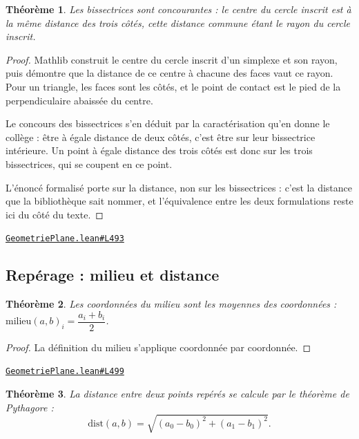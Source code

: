 \documentclass[11pt,a4paper]{article}
\theoremstyle{definition}
\theoremstyle{plain}
\newtheorem{theoreme}{Théorème}
\newcommand{\source}[2]{\par\smallskip\noindent\hfill{\footnotesize\href{#1}{\texttt{#2}}}\par\smallskip}
\begin{document}
\begin{theoreme}
Les bissectrices sont concourantes : le centre du cercle inscrit est à la même distance
des trois côtés, cette distance commune étant le rayon du cercle inscrit.
\end{theoreme}

\begin{proof}
Mathlib construit le centre du cercle inscrit d'un simplexe et son rayon, puis démontre que
la distance de ce centre à chacune des faces vaut ce rayon. Pour un triangle, les faces sont
les côtés, et le point de contact est le pied de la perpendiculaire abaissée du centre.

Le concours des bissectrices s'en déduit par la caractérisation qu'en donne le collège :
être à égale distance de deux côtés, c'est être sur leur bissectrice intérieure. Un point à
égale distance des trois côtés est donc sur les trois bissectrices, qui se coupent en ce
point.

L'énoncé formalisé porte sur la distance, non sur les bissectrices : c'est la distance que
la bibliothèque sait nommer, et l'équivalence entre les deux formulations reste ici du côté
du texte.
\end{proof}
\source{https://github.com/Commutator-IO/learn-lean/blob/main/courses/01-college/02-geometrie-plane/GeometriePlane.lean\#L493}{GeometriePlane.lean\#L493}

\subsection{Repérage : milieu et distance}

\begin{theoreme}
Les coordonnées du milieu sont les moyennes des coordonnées :
$\text{milieu}(a,b)_i = \dfrac{a_i + b_i}{2}$.
\end{theoreme}

\begin{proof}
La définition du milieu s'applique coordonnée par coordonnée.
\end{proof}
\source{https://github.com/Commutator-IO/learn-lean/blob/main/courses/01-college/02-geometrie-plane/GeometriePlane.lean\#L499}{GeometriePlane.lean\#L499}

\begin{theoreme}
La distance entre deux points repérés se calcule par le théorème de Pythagore :
\[ \mathrm{dist}(a,b) = \sqrt{(a_0 - b_0)^2 + (a_1 - b_1)^2} . \]
\end{theoreme}
\end{document}
